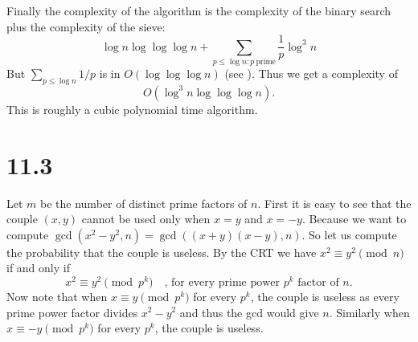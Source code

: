 \documentclass[12pt,a4paper]{article}
\begin{document}
        Finally the complexity of the algorithm is the complexity of the binary search plus the complexity of the sieve:
        \[
            \log n \log\log\log n + \sum_{p \leq \log n : p\:\mathrm{prime}} \frac 1 p \log^3 n
        \]
        But $\sum_{p \leq \log n}{1/p}$ is in $O(\log\log\log n)$ (see \cite{prime}).
        Thus we get a complexity of \[O(\log^3n\log\log\log n).\] This is roughly a cubic polynomial time algorithm.

    \section{11.3}
        Let $m$ be the number of distinct prime factors of $n$.
        First it is easy to see that the couple $(x,y)$ cannot be used only when $x = y$ and $x = -y$. Because we want to compute $\gcd(x^2-y^2,n) = \gcd((x+y)(x-y),n)$.
        So let us compute the probability that the couple is useless.         
        By the CRT we have $x^2 \equiv y^2 \pmod n$ if and only if
        \[
            x^2 \equiv y^2 \pmod{p^k} \quad \text{, for every prime power $p^k$ factor of $n$.}
        \]
        Now note that when $x \equiv y \pmod{p^k}$ for every $p^k$, the couple is useless as every prime power factor divides $x^2-y^2$ and thus the gcd would give $n$.
        Similarly when $x \equiv -y \pmod{p^k}$ for every $p^k$, the couple is useless.
        
\end{document}
